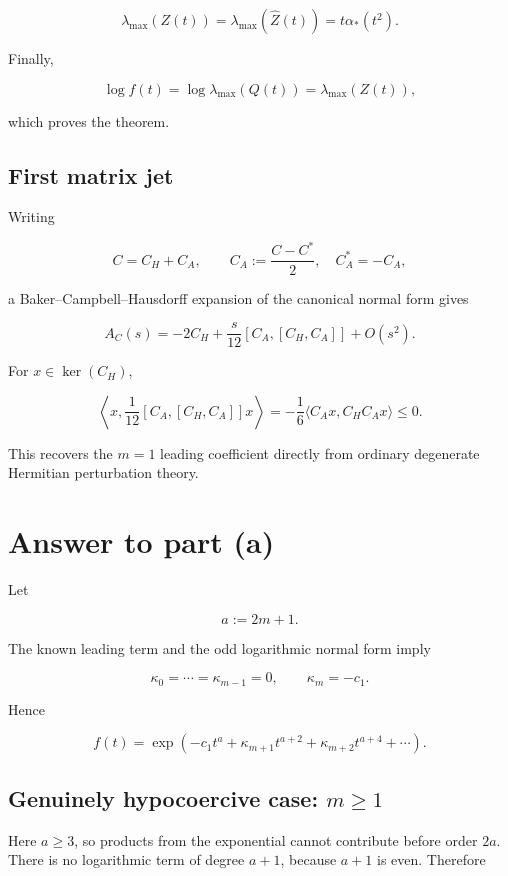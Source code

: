 \documentclass[11pt,a4paper]{article}
\begin{document}
\[
\lambda_{\max}(Z(t))
 =\lambda_{\max}(\widehat Z(t))
 =t\alpha_*(t^2).
\]

Finally,

\[
\log f(t)=\log\lambda_{\max}(Q(t))=\lambda_{\max}(Z(t)),
\]

which proves the theorem.

\subsection{First matrix jet}\label{first-matrix-jet}

Writing

\[
C=C_H+C_A,\qquad C_A:=\frac{C-C^*}{2},\quad C_A^*=-C_A,
\]

a Baker--Campbell--Hausdorff expansion of the canonical normal form gives

\[
\boxed{
 A_C(s)=-2C_H+\frac{s}{12}[C_A,[C_H,C_A]]+O(s^2).
}
\]

For \(x\in\ker(C_H)\),

\[
\left\langle x,\frac1{12}[C_A,[C_H,C_A]]x\right\rangle
=-\frac16\langle C_Ax,C_HC_Ax\rangle\le0.
\]

This recovers the \(m=1\) leading coefficient directly from ordinary degenerate Hermitian perturbation theory.

\section{Answer to part (a)}\label{answer-to-part-a}

Let

\[
a:=2m+1.
\]

The known leading term and the odd logarithmic normal form imply

\[
\kappa_0=\cdots=\kappa_{m-1}=0,
\qquad
\kappa_m=-c_1.
\]

Hence

\[
f(t)=\exp\!\left(-c_1t^a+\kappa_{m+1}t^{a+2}+\kappa_{m+2}t^{a+4}+\cdots\right).
\]

\subsection{\texorpdfstring{Genuinely hypocoercive case: \(m\ge 1\)}{Genuinely hypocoercive case: m\textbackslash ge 1}}\label{genuinely-hypocoercive-case-mge-1}

Here \(a\ge 3\), so products from the exponential cannot contribute before order \(2a\). There is no logarithmic term of degree \(a+1\), because \(a+1\) is even. Therefore
\end{document}
